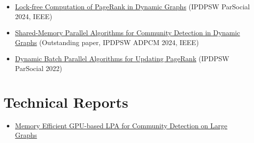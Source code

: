 \begin{itemize}[noitemsep, leftmargin=*]
  \item \href{https://ieeexplore.ieee.org/abstract/document/10596502/}{Lock-free Computation of PageRank in Dynamic Graphs} (IPDPSW ParSocial 2024, IEEE)
  \item \href{https://ieeexplore.ieee.org/abstract/document/10596428/}{Shared-Memory Parallel Algorithms for Community Detection in Dynamic Graphs} (Outstanding paper, IPDPSW ADPCM 2024, IEEE)
  \item \href{https://ieeexplore.ieee.org/abstract/document/9835216/}{Dynamic Batch Parallel Algorithms for Updating PageRank} (IPDPSW ParSocial 2022)
\end{itemize}




\section*{Technical Reports}

\begin{itemize}[noitemsep, leftmargin=*]
  \item \href{https://arxiv.org/abs/2411.19901}{Memory Efficient GPU-based LPA for Community Detection on Large Graphs}
\end{itemize}
